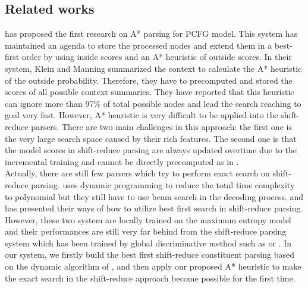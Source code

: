 \subsection*{Related works}
\cite{2003DanNAACL} has proposed the first research on A* parsing for PCFG model. This system has maintained an agenda to store the processed nodes and extend them in a best-first order by using inside scores and an A* heuristic of outside scores. In their system, Klein and Manning summarized the context to calculate the A* heuristic of the outside probability. Therefore, they have to precomputed and stored the scores of all possible context summaries. They have reported that this heuristic can ignore more than 97\% of total possible nodes and lead the search reaching to goal very fast. However, A* heuristic is very difficult to be applied into the shift-reduce parsers. There are two main challenges in this approach: the first one is the very large search space caused by their rich features. The second one is that the model scores in shift-reduce parsing are always updated overtime due to the incremental training and cannot be directly precomputed as in \cite{2003DanNAACL}. \\
\indent Actually, there are still few parsers which try to perform exact search on shift-reduce parsing. \cite{2010Huang} uses dynamic programming to reduce the total time complexity to polynomial but they still have to use beam search in the decoding process. \cite{2006Sagae} and \cite{2013Zhao} has presented their ways of how to utilize best first search in shift-reduce parsing. However, these two system are locally trained on the maximum entropy model and their performances are still very far behind from the shift-reduce parsing system which has been trained by global discriminative method such as \cite{2012Zhu} or \cite{2009Zhang}. In our system, we firstly build the best first shift-reduce constituent parsing based on the dynamic algorithm of \cite{2010Huang}, and then apply our proposed A* heuristic to make the exact search in the shift-reduce approach become possible for the first time.